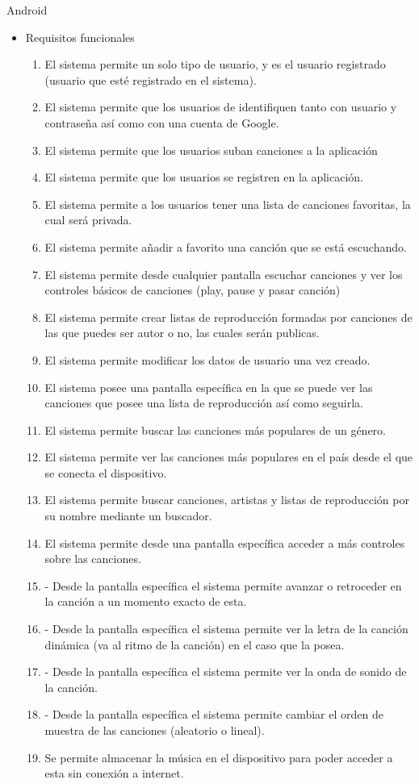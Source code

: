 Android 

\begin{itemize}
\item Requisitos funcionales
\begin{enumerate}
\item El sistema permite un solo tipo de usuario, y es el usuario registrado (usuario que esté registrado en el sistema).
\item El sistema permite que los usuarios de identifiquen tanto con usuario y contraseña así como con una cuenta de Google.
\item El sistema permite que los usuarios suban canciones a la aplicación
\item El sistema permite que los usuarios se registren en la aplicación.
\item El sistema permite a los usuarios tener una lista de canciones favoritas, la cual será privada.
\item El sistema permite añadir a favorito una canción que se está escuchando.
\item El sistema permite desde cualquier pantalla escuchar canciones y ver los controles básicos de canciones (play, pause y pasar canción)
\item El sistema permite crear listas de reproducción formadas por canciones de las que puedes ser autor o no, las cuales serán publicas.
\item El sistema permite modificar los datos de usuario una vez creado.
\item El sistema posee una pantalla específica en la que se puede ver las canciones que posee una lista de reproducción así como seguirla.
\item El sistema permite buscar las canciones más populares de un género.
\item El sistema permite ver las canciones más populares en el país desde el que se conecta el dispositivo.
\item El sistema permite buscar canciones, artistas y listas de reproducción por su nombre mediante un buscador.
\item El sistema permite desde una pantalla específica acceder a más controles sobre las canciones.
\item - Desde la pantalla específica el sistema permite avanzar o retroceder en la canción a un momento exacto de esta.
\item - Desde la pantalla específica el sistema permite ver la letra de la canción dinámica (va al ritmo de la canción) en el caso que la posea.
\item - Desde la pantalla específica el sistema permite ver la onda de sonido de la canción.
\item - Desde la pantalla específica el sistema permite cambiar el orden de muestra de las canciones (aleatorio o lineal).
\item Se permite almacenar la música en el dispositivo para poder acceder a esta sin conexión a internet.
\end{enumerate}


\end{itemize}
